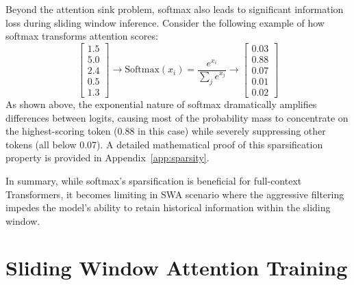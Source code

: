 Beyond the attention sink problem, softmax also leads to significant information loss during sliding window inference. Consider the following example of how softmax transforms attention scores:
\begin{equation}
\begin{bmatrix}
1.5 \\
5.0 \\
2.4 \\
0.5 \\
1.3
\end{bmatrix}
\to \text{Softmax}(x_i) = \frac{e^{x_i}}{\sum_{j} e^{x_j}} \to
\begin{bmatrix}
0.03 \\
0.88 \\
0.07 \\
0.01 \\
0.02
\end{bmatrix}
\end{equation}
As shown above, the exponential nature of softmax dramatically amplifies differences between logits, causing most of the probability mass to concentrate on the highest-scoring token (0.88 in this case) while severely suppressing other tokens (all below 0.07). A detailed mathematical proof of this sparsification property is provided in Appendix~\ref{app:sparsity}.

In summary, while softmax's sparsification is beneficial for full-context Transformers, it becomes limiting in SWA scenario where the aggressive filtering impedes the model's ability to retain historical information within the sliding window.



\section{Sliding Window Attention Training}

